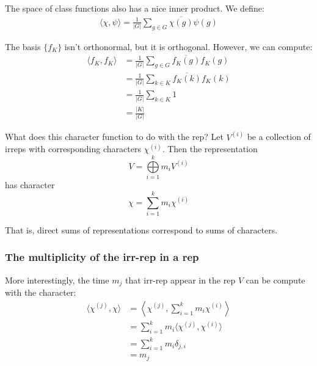 \documentclass[]{ctexart}
\begin{document}
			The space of class functions also has a nice inner product. We define:
				\begin{equation*}
				\begin{aligned}
					\langle\chi,\psi\rangle=\frac{1}{\lvert G\rvert}\sum\limits_{g\in G}\overline{\chi(g)}\psi(g)
				\end{aligned}
				\end{equation*}
			
			The basis $ \{f_K\} $ isn’t orthonormal, but it is orthogonal. However, we can compute:
				\begin{equation*}
				\begin{aligned}
					\langle f_K,f_K\rangle&=\frac{1}{\lvert G\rvert}\sum\limits_{g\in G}\overline{f_K(g)}f_K(g)\\
					&=\frac{1}{\lvert G\rvert}\sum\limits_{k\in K}\overline{f_K(k)}f_K(k)\\
					&=\frac{1}{\lvert G\rvert}\sum\limits_{k\in K}1\\
					&=\frac{\lvert K\rvert}{\lvert G\rvert}
				\end{aligned}
				\end{equation*}
			
			What does this character function to do with the rep? Let $ V^{(i)} $ be a collection of irreps with corresponding characters $ \chi^{(i)} $. Then the representation
			\begin{equation*}	
			V=\bigoplus\limits_{i=1}^km_iV^{(i)}
			\end{equation*}
			has character
			\begin{equation*}
			\chi=\sum\limits_{i=1}^km_i\chi^{(i)}
			\end{equation*}
			
			That is, direct sums of representations correspond to sums of characters.
		\subsubsection{The multiplicity of the irr-rep in a rep}
			More interestingly, the time $m_j$ that irr-rep  appear in the rep $ V $ can be compute with the character:
				\begin{equation*}
				\begin{aligned}
					\langle\chi^{(j)},\chi\rangle&=\left\langle\chi^{(j)},\sum\limits_{i=1}^km_i\chi^{(i)}\right\rangle\\
					&=\sum\limits_{i=1}^km_i\langle\chi^{(j)},\chi^{(i)}\rangle\\
					&=\sum\limits_{i=1}^km_i\delta_{j,i}\\
					&=m_j
				\end{aligned}
				\end{equation*}
\end{document}
